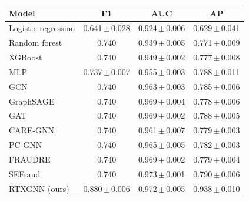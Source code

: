 \begin{tabular}{lccc}
\toprule
Model & F1 & AUC & AP\\
\midrule
Logistic regression & 0.641\,$\pm$\,0.028 & 0.924\,$\pm$\,0.006 & 0.629\,$\pm$\,0.041\\
Random forest & 0.740 & 0.939\,$\pm$\,0.005 & 0.771\,$\pm$\,0.009\\
XGBoost & 0.740 & 0.949\,$\pm$\,0.002 & 0.777\,$\pm$\,0.008\\
MLP & 0.737\,$\pm$\,0.007 & 0.955\,$\pm$\,0.003 & 0.788\,$\pm$\,0.011\\
GCN & 0.740 & 0.963\,$\pm$\,0.003 & 0.785\,$\pm$\,0.006\\
GraphSAGE & 0.740 & 0.969\,$\pm$\,0.004 & 0.778\,$\pm$\,0.006\\
GAT & 0.740 & 0.969\,$\pm$\,0.002 & 0.788\,$\pm$\,0.005\\
CARE-GNN & 0.740 & 0.961\,$\pm$\,0.007 & 0.779\,$\pm$\,0.003\\
PC-GNN & 0.740 & 0.965\,$\pm$\,0.005 & 0.782\,$\pm$\,0.003\\
FRAUDRE & 0.740 & 0.969\,$\pm$\,0.002 & 0.779\,$\pm$\,0.004\\
SEFraud & 0.740 & 0.973\,$\pm$\,0.001 & 0.790\,$\pm$\,0.006\\
RTXGNN (ours) & 0.880\,$\pm$\,0.006 & 0.972\,$\pm$\,0.005 & 0.938\,$\pm$\,0.010\\
\bottomrule
\end{tabular}
